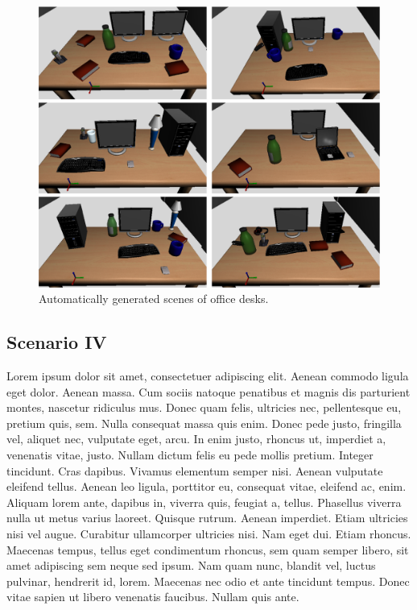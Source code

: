 \documentclass[conference]{IEEEtran}
\begin{document}
\begin{figure}[tb]
  \centering
  \includegraphics[width=.9\columnwidth]{figs/scenes.png}
  \caption{Automatically generated scenes of office desks.}
  \label{fig:simulated-desktop-scenes}
\end{figure}

\subsection{Scenario IV}
\label{scenario4}

Lorem ipsum dolor sit amet, consectetuer adipiscing elit. Aenean commodo ligula eget dolor. Aenean massa. Cum sociis natoque penatibus et magnis dis parturient montes, nascetur ridiculus mus. Donec quam felis, ultricies nec, pellentesque eu, pretium quis, sem. Nulla consequat massa quis enim. Donec pede justo, fringilla vel, aliquet nec, vulputate eget, arcu. In enim justo, rhoncus ut, imperdiet a, venenatis vitae, justo. Nullam dictum felis eu pede mollis pretium. Integer tincidunt. Cras dapibus. Vivamus elementum semper nisi. Aenean vulputate eleifend tellus. Aenean leo ligula, porttitor eu, consequat vitae, eleifend ac, enim. Aliquam lorem ante, dapibus in, viverra quis, feugiat a, tellus. Phasellus viverra nulla ut metus varius laoreet. Quisque rutrum. Aenean imperdiet. Etiam ultricies nisi vel augue. Curabitur ullamcorper ultricies nisi. Nam eget dui. Etiam rhoncus. Maecenas tempus, tellus eget condimentum rhoncus, sem quam semper libero, sit amet adipiscing sem neque sed ipsum. Nam quam nunc, blandit vel, luctus pulvinar, hendrerit id, lorem. Maecenas nec odio et ante tincidunt tempus. Donec vitae sapien ut libero venenatis faucibus. Nullam quis ante. 
\end{document}
